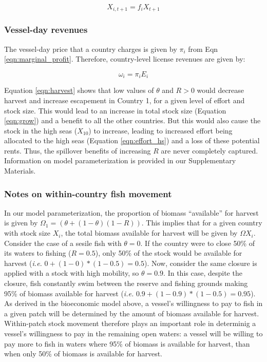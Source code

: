\documentclass[12pt]{article}
\begin{document}
\begin{equation}
X_{i,t+1} = f_iX_{t+1}
\label{eqn:disperse}
\end{equation}

\subsubsection{Vessel-day revenues}

The vessel-day price that a country charges is given by $\pi_i$ from Eqn \ref{eqn:marginal_profit}. Therefore, country-level license revenues are given by:

\begin{equation}
\omega_i = \pi_iE_i
\label{eqn:license_revenue}
\end{equation}

\noindent Equation \ref{eqn:harvest} shows that low values of $\theta$ and $R > 0$ would decrease harvest and increase escapement in Country 1, for a given level of effort and stock size. This would lead to an increase in total stock size (Equation \ref{eqn:grow}) and a benefit to all the other countries. But this would also cause the stock in the high seas ($X_{10}$) to increase, leading to increased effort being allocated to the high seas (Equation \ref{eqn:effort_hs}) and a loss of these potential rents. Thus, the spillover benefits of increasing $R$ are never completely captured. Information on model parameterization is provided in our Supplementary Materials.

\subsubsection{Notes on within-country fish movement}

In our model parameterization, the proportion of biomass ``available'' for harvest is given by  $\Omega_1 = (\theta + (1 - \theta)(1 - R))$. This implies that for a given country with stock size $X_i$, the total biomass available for harvest will be given by $\Omega X_i$. Consider the case of a sesile fish with $\theta = 0$. If the country were to close 50\% of its waters to fishing ($R = 0.5$), only 50\% of the stock would be available for harvest (\emph{i.e.} $0 + (1 - 0) * (1 - 0.5) = 0.5$). Now, consider the same closure is applied with a stock with high mobility, so $\theta = 0.9$. In this case, despite the closure, fish constantly swim between the reserve and fishing grounds making 95\% of biomass available for harvest (\emph{i.e.} $0.9 + (1 - 0.9) * (1 - 0.5) = 0.95$). As derived in the bioeconomic model above, a vessel's willingness to pay to fish in a given patch will be determined by the amount of biomass available for harvest. Within-patch stock movement therefore plays an important role in determinig a vessel's willingness to pay in the remaining open waters: a vessel will be willing to pay more to fish in waters where 95\% of biomass is available for harvest, than when only 50\% of biomass is available for harvest.
\end{document}
